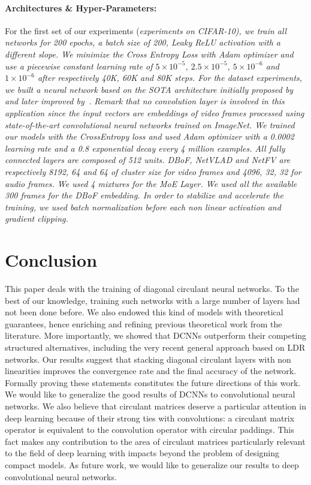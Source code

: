 \paragraph{Architectures \& Hyper-Parameters:} 
For the first set of our experiments (\em experiments on CIFAR-10), we train all networks for 200 epochs, a batch size of 200, Leaky ReLU activation with a different slope. We minimize the Cross Entropy Loss with Adam optimizer and use a piecewise constant learning rate of $5 \times 10^{-5}$, $2.5\times10^{-5}$, $5\times10^{-6}$ and $1\times10^{-6}$ after respectively 40K, 60K and 80K steps. For the \yt dataset experiments, we built a neural network based on the SOTA architecture initially proposed by \cite{abu2016youtube} and later improved by~\cite{miech2017learnable}. Remark that no convolution layer is involved in this application since the input vectors are embeddings of video frames processed using state-of-the-art convolutional neural networks trained on ImageNet. We trained our models with the CrossEntropy loss and used Adam optimizer with a 0.0002 learning rate and a 0.8 exponential decay every 4 million examples. All fully connected layers are composed of 512 units. DBoF, NetVLAD and NetFV are respectively 8192, 64 and 64 of cluster size for video frames and 4096, 32, 32 for audio frames. We used 4 mixtures for the MoE Layer. We used all the available 300 frames for the DBoF embedding. In order to stabilize and accelerate the training, we used batch normalization before each non linear activation and gradient clipping. 

\section{Conclusion}
\label{section:conclusion}

This paper deals with the training of diagonal circulant neural networks.
To the best of our knowledge, training such networks with a large number of layers had not been done before.
We also endowed this kind of models with theoretical guarantees, hence enriching and refining previous theoretical work from the literature.
More importantly, we showed that DCNNs outperform their competing structured alternatives, including the very recent general approach based on LDR networks.
Our results suggest that stacking diagonal circulant layers with non linearities improves the convergence rate and the final accuracy of the network.
Formally proving these statements constitutes the future directions of this work.
We would like to generalize the good results of DCNNs to convolutional neural networks.
We also believe that circulant matrices deserve a particular attention in deep learning because of their strong ties with convolutions: a circulant matrix operator is equivalent to the convolution operator with circular paddings.
This fact makes any contribution to the area of circulant matrices particularly relevant to the field of deep learning with impacts beyond the problem of designing compact models.
As future work, we would like to generalize our results to deep convolutional neural networks. 


